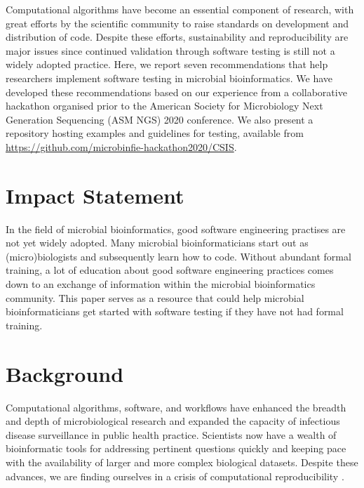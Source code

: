 Computational algorithms have become an essential component of research, with great efforts by the scientific community to raise standards on development and distribution of code. Despite these efforts, sustainability and reproducibility are major issues since continued validation through software testing is still not a widely adopted practice. Here, we report seven recommendations that help researchers implement software testing in microbial bioinformatics. We have developed these recommendations based on our experience from a collaborative hackathon organised prior to the American Society for Microbiology Next Generation Sequencing (ASM NGS) 2020 conference. We also present a repository hosting examples and guidelines for testing, available from \url{https://github.com/microbinfie-hackathon2020/CSIS}.


\section{Impact Statement}

In the field of microbial bioinformatics, good software engineering practises are not yet widely adopted. Many microbial bioinformaticians start out as (micro)biologists and subsequently learn how to code. Without abundant formal training, a lot of education about good software engineering practices comes down to an exchange of information within the microbial bioinformatics community. This paper serves as a resource that could help microbial bioinformaticians get started with software testing if they have not had formal training.

\section{Background}

Computational algorithms, software, and workflows have enhanced the breadth and depth of microbiological research and expanded the capacity of infectious disease surveillance in public health practice. Scientists now have a wealth of bioinformatic tools for addressing pertinent questions quickly and keeping pace with the availability of larger and more complex biological datasets. Despite these advances, we are finding ourselves in a crisis of computational reproducibility \cite{stodden_empirical_2018}.

